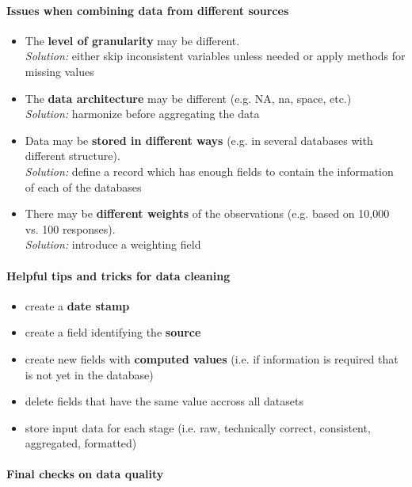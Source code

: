 \documentclass[a4paper, landscape, 6pt, fleqn]{scrartcl}
\renewcommand{\emph}[1]{\textbf{#1}}
\begin{document}
\begin{multicols*}{4}
\paragraph{Issues when combining data from different sources}

\begin{itemize}
\item The \emph{level of granularity} may be different. \\
\textit{Solution:} either skip inconsistent variables unless needed or apply methods for missing values
\item The \emph{data architecture} may be different (e.g. NA, na, space, etc.) \\
\textit{Solution:} harmonize before aggregating the data
\item Data may be \emph{stored in different ways} (e.g. in several databases with different structure). \\
\textit{Solution:} define a record which has enough fields to contain the information of each of the databases
\item There may be \emph{different weights} of the observations (e.g. based on 10,000 vs. 100 responses). \\
\textit{Solution:} introduce a weighting field
\end{itemize}

\paragraph{Helpful tips and tricks for data cleaning}

\begin{itemize}
\item create a \emph{date stamp}
\item create a field identifying the \emph{source}
\item create new fields with \emph{computed values} (i.e. if information is required that is not yet in the database)
\item delete fields that have the same value accross all datasets
\item store input data for each stage (i.e. raw, technically correct, consistent, aggregated, formatted)
\end{itemize}

\paragraph{Final checks on data quality}


\end{multicols*}
\end{document}

